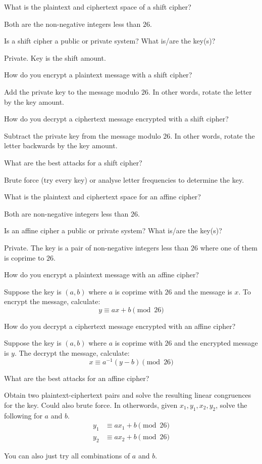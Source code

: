 \documentclass{article}
\newcounter{qcounter}
\newcommand{\showqcounter}{\theqcounter}
\newcommand{\question}{\vspace{5mm}\addtocounter{qcounter}{1}\vspace{5mm}{\bf Q\showqcounter: }}
\newcommand{\answer}{\vspace{5mm}{\bf A\showqcounter: }}
\begin{document}
\question What is the plaintext and ciphertext space of a shift cipher?

\answer Both are the non-negative integers less than $26$.


\question Is a shift cipher a public or private system? What is/are the key(s)?

\answer Private. Key is the shift amount.


\question How do you encrypt a plaintext message with a shift cipher?

\answer Add the private key to the message modulo $26$. In other words, rotate the letter by the key amount.


\question How do you decrypt a ciphertext message encrypted with a shift cipher?

\answer Subtract the private key from the message modulo $26$. In other words, rotate the letter backwards by the key amount.


\question What are the best attacks for a shift cipher?

\answer Brute force (try every key) or analyse letter frequencies to determine the key.


\question What is the plaintext and ciphertext space for an affine cipher?

\answer Both are non-negative integers less than $26$.


\question Is an affine cipher a public or private system? What is/are the key(s)?

\answer Private. The key is a pair of non-negative integers less than $26$ where one of them is coprime to $26$.


\question How do you encrypt a plaintext message with an affine cipher?

\answer Suppose the key is $(a, b)$ where $a$ is coprime with $26$ and the message is $x$. To encrypt the message, calculate:
  $$
    y \equiv ax + b \pmod{26}
  $$


\question How do you decrypt a ciphertext message encrypted with an affine cipher?

\answer Suppose the key is $(a, b)$ where $a$ is coprime with $26$ and the encrypted message is $y$. The decrypt the message, calculate: 
  $$
    x \equiv a^{-1}(y - b) \pmod{26}
  $$

\question What are the best attacks for an affine cipher?

\answer Obtain two plaintext-ciphertext pairs and solve the resulting linear congruences for the key. Could also brute force.
  In otherwords, given $x_1, y_1, x_2, y_2$, solve the following for $a$ and $b$.
  \begin{align*}
    y_1 &\equiv ax_1 + b \pmod{26}\\
    y_2 &\equiv ax_2 + b \pmod{26}
  \end{align*}

  You can also just try all combinations of $a$ and $b$.

\question 

\answer 


\question 

\answer 


\question 

\answer 


\question 

\answer 


\question 

\answer 
\end{document}
